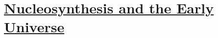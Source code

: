 \section[Nucleosynthesis and the Early Universe]{\hyperlink{toc}{Nucleosynthesis and the Early Universe}}

\subsection{}
\subsection{}
\subsection{}
\subsection{}
